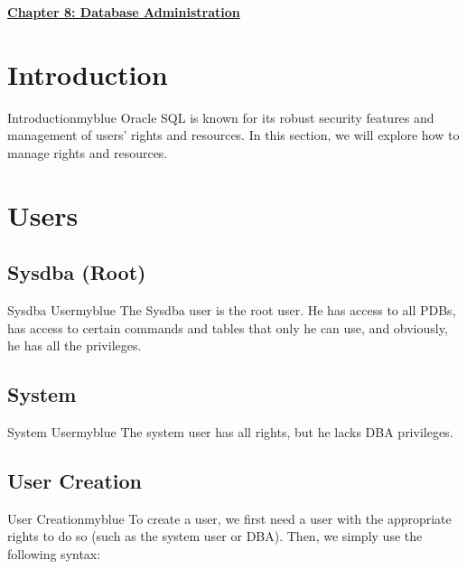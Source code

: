 \newpage 
\null 
\vspace{0.15cm}

\begin{center} 
\Huge{\textbf{\underline{Chapter 8: Database Administration}}}
\end{center}

\vspace{0.25cm}

\setcounter{section}{0}

\vspace{1cm}

\section{Introduction}

\begin{prettyBox}{Introduction}{myblue} 
Oracle SQL is known for its robust security features and management of users' 
rights and resources. In this section, we will explore how to manage rights 
and resources.
\end{prettyBox}

\vspace{0.35cm}

\section{Users}

\subsection{Sysdba (Root)} 
\begin{prettyBox}{Sysdba User}{myblue} 
The Sysdba user is the root user. He has access to all PDBs, has access to
certain commands and tables that only he can use, and obviously, he has all
the privileges.
\end{prettyBox}

\vspace{0.25cm}
\subsection{System}

\begin{prettyBox}{System User}{myblue} 
The system user has all rights, but he lacks DBA privileges.
\end{prettyBox}

\vspace{0.25cm}
\subsection{User Creation}
\begin{prettyBox}{User Creation}{myblue}
To create a user, we first need a user with the appropriate rights to do so 
(such as the system user or DBA).
Then, we simply use the following syntax:
\end{prettyBox}

